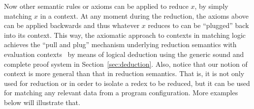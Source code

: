 \documentclass[UTF8,11pt]{article}
\theoremstyle{plain}
\theoremstyle{definition}
\theoremstyle{remark}
\begin{document}
Now other semantic rules or axioms can be applied to reduce $x$, by
simply matching $x$ in a context.
At any moment during the reduction, the axioms above can be applied
backwards and thus whatever $x$ reduces to can be ``plugged'' back into
its context.
This way, the axiomatic approach to contexts in matching logic
achieves the ``pull and plug'' mechanism underlying reduction
semantics with evaluation contexts~\cite{felleisen-hieb-92} by
means of logical deduction using the generic sound and complete
proof system in Section~\ref{sec:deduction}.
Also, notice that our notion of context is more general than
that in reduction semantics.
That is, it is not only used for reduction or in order to isolate
a redex to be reduced, but it can be used for matching any relevant
data from a program configuration.
More examples below will illustrate that.
\end{document}
